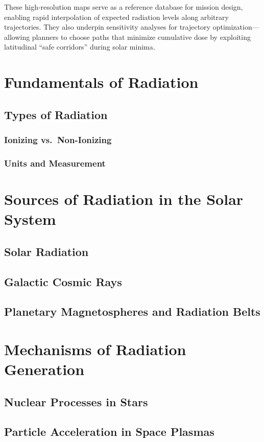 \documentclass[12pt]{report}
\begin{document}
These high‐resolution maps serve as a reference database for mission design, enabling rapid interpolation of expected radiation levels along arbitrary trajectories.  They also underpin sensitivity analyses for trajectory optimization—allowing planners to choose paths that minimize cumulative dose by exploiting latitudinal “safe corridors” during solar minima.




\bigskip
\noindent 

\chapter{Fundamentals of Radiation}
\section{Types of Radiation}
\subsection{Ionizing vs.\ Non-Ionizing}
\subsection{Units and Measurement}

\chapter{Sources of Radiation in the Solar System}
\section{Solar Radiation}
\section{Galactic Cosmic Rays}
\section{Planetary Magnetospheres and Radiation Belts}

\chapter{Mechanisms of Radiation Generation}
\section{Nuclear Processes in Stars}
\section{Particle Acceleration in Space Plasmas}
\end{document}
